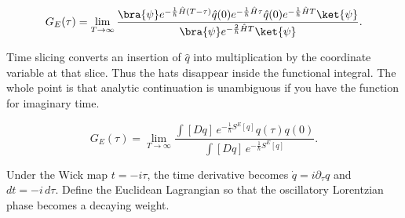 \begin{equation}
  G_E(\tau)
  =\lim_{T\to\infty}
  \frac{
  \bra{\psi}
  e^{-\frac{1}{\hbar}\hat H(T-\tau)}
  \hat q(0)e^{-\frac{1}{\hbar}\hat H\tau}
  \hat q(0)e^{-\frac{1}{\hbar}\hat HT}
  \ket{\psi}}
  {\bra{\psi}e^{-\frac{2}{\hbar}\hat HT}\ket{\psi}}.
  \label{eq:proposal-normalized-operator-correlator}
\end{equation}


Time slicing converts an insertion of $\hat q$ into multiplication by the
coordinate variable at that slice.  Thus the hats disappear inside the
functional integral.  The whole point is that analytic continuation is
unambiguous if you have the function for imaginary time.

\begin{equation}
  G_E(\tau)
  =\lim_{T\to\infty}
  \frac{
    \displaystyle\int[Dq]\,
    e^{-\frac{1}{\hbar}S^E[q]}q(\tau)q(0)}
  {
    \displaystyle\int[Dq]\,
    e^{-\frac{1}{\hbar}S^E[q]}}.
  \label{eq:proposal-normalized-euclidean-path-integral}
\end{equation}


Under the Wick map $t=-i\tau$, the time derivative becomes
$\dot q=i\partial_\tau q$ and $dt=-i\,d\tau$.  Define the Euclidean
Lagrangian so that the oscillatory Lorentzian phase becomes a decaying weight.

